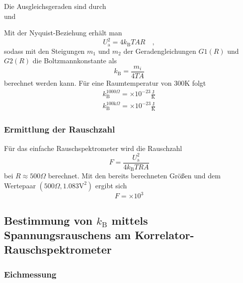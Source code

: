 		Die Ausgleichsgeraden sind durch
		\begin{equation}
			
		\end{equation}
		und
		\begin{equation}
			
		\end{equation}
		
		Mit der Nyquist-Beziehung erhält man
		\begin{equation}
			U_\text{a}^2 =4k_\text{B}T A R \quad , 
		\end{equation}
		sodass mit den Steigungen $m_1$ und $m_2$ der Geradengleichungen $G1(R)$ und $G2(R)$ 
		die Boltzmannkonstante als
		\begin{equation}
		k_\text{B}=\frac{m_i}{4 T A}
		\end{equation}
		berechnet werden kann. Für eine Raumtemperatur von $300$K folgt
		\begin{align}
		k_\text{B}^{1000\Omega}			=  \times 10^{-23}\frac{\text{J}}
																			{\text{K}}  \\ 
		k_\text{B}^{100\text{k}\Omega}	=  \times 10^{-23}\frac{\text{J}}
																			{\text{K}} 
		\end{align}
	
	\subsubsection{Ermittlung der Rauschzahl}
		Für das einfache Rauschspektrometer wird die Rauschzahl 
		\begin{equation}
			F = \frac{U_\text{a}^2}{4 k_\text{B}T R A}
		\end{equation}
		bei $R\approx 500\Omega$ berechnet. Mit den bereits berechneten Größen und 
		dem Wertepaar $(500\Omega,1.083 \text{V}^2)$ ergibt sich 
		\begin{equation}
			F =  \times 10^{3}
		\end{equation}
		
		
		
		
		
		
\clearpage		
\subsection{Bestimmung von $k_\text{B}$ mittels Spannungsrauschens am 
			Korrelator-Rauschspektrometer}
			
		\subsubsection{Eichmessung}
	
